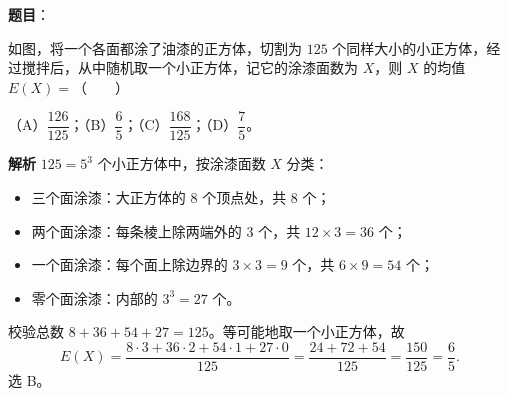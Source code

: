 \begin{answer}

\textbf{题目}：

如图，将一个各面都涂了油漆的正方体，切割为 $125$ 个同样大小的小正方体，经过搅拌后，从中随机取一个小正方体，记它的涂漆面数为 $X$，则 $X$ 的均值 $E(X)=$\mbox{（　　）}
\nopagebreak[4]
\begin{center}\end{center}
\nopagebreak[4]
（A）$\dfrac{126}{125}$；（B）$\dfrac65$；（C）$\dfrac{168}{125}$；（D）$\dfrac75$。

\textbf{解析}
$125=5^3$ 个小正方体中，按涂漆面数 $X$ 分类：

\begin{itemize}
\item 三个面涂漆：大正方体的 $8$ 个顶点处，共 $8$ 个；
\item 两个面涂漆：每条棱上除两端外的 $3$ 个，共 $12\times3=36$ 个；
\item 一个面涂漆：每个面上除边界的 $3\times3=9$ 个，共 $6\times9=54$ 个；
\item 零个面涂漆：内部的 $3^3=27$ 个。
\end{itemize}

校验总数 $8+36+54+27=125$。等可能地取一个小正方体，故
\nopagebreak[4]
\[E(X)=\frac{8\cdot3+36\cdot2+54\cdot1+27\cdot0}{125}
=\frac{24+72+54}{125}
=\frac{150}{125}=\frac65.\]
选 B。


\end{answer}
